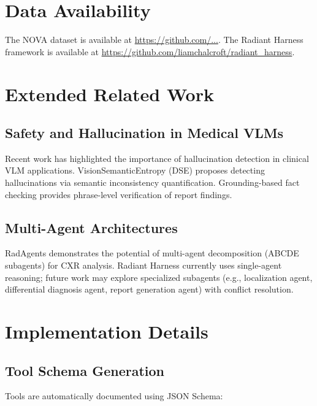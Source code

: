 \documentclass[11pt]{article}
\begin{document}
\section*{Data Availability}

The NOVA dataset is available at \url{https://github.com/...}. The Radiant Harness framework is available at \url{https://github.com/liamchalcroft/radiant_harness}.




\appendix

\section{Extended Related Work}

\subsection{Safety and Hallucination in Medical VLMs}

Recent work has highlighted the importance of hallucination detection in clinical VLM applications. VisionSemanticEntropy (DSE) \citep{dse2024} proposes detecting hallucinations via semantic inconsistency quantification. Grounding-based fact checking \citep{groundingfactcheck2024} provides phrase-level verification of report findings.

\subsection{Multi-Agent Architectures}

RadAgents \citep{radagents2025} demonstrates the potential of multi-agent decomposition (ABCDE subagents) for CXR analysis. Radiant Harness currently uses single-agent reasoning; future work may explore specialized subagents (e.g., localization agent, differential diagnosis agent, report generation agent) with conflict resolution.

\section{Implementation Details}

\subsection{Tool Schema Generation}

Tools are automatically documented using JSON Schema:
\end{document}
